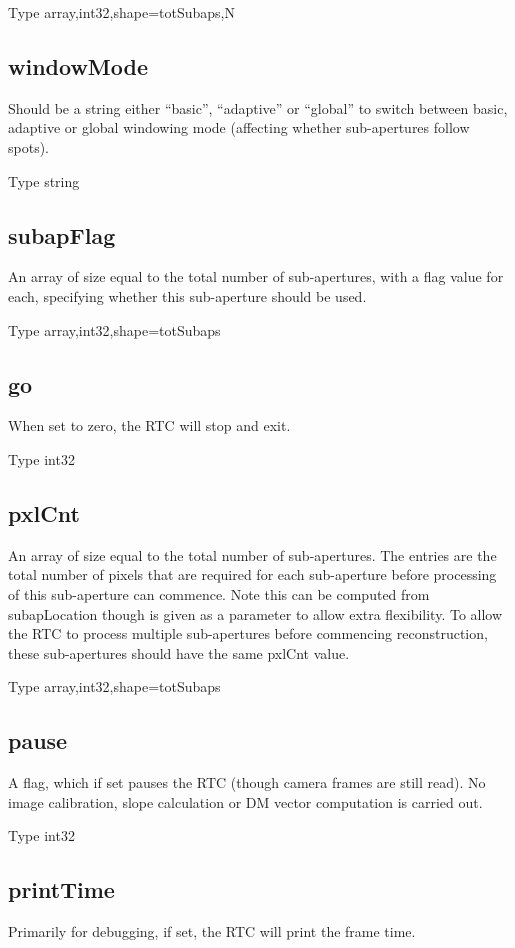 \documentclass[a4,10pt]{article}
\begin{document}
Type array,int32,shape=totSubaps,N

\subsection{windowMode}
Should be a string either ``basic'', ``adaptive'' or ``global'' to
switch between basic, adaptive or global windowing mode (affecting
whether sub-apertures follow spots).

Type string

\subsection{subapFlag}
An array of size equal to the total number of sub-apertures, with a
flag value for each, specifying whether this sub-aperture should be
used.

Type array,int32,shape=totSubaps

\subsection{go}
When set to zero, the RTC will stop and exit.

Type int32

\subsection{pxlCnt}
An array of size equal to the total number of sub-apertures.  The
entries are the total number of pixels that are required for each
sub-aperture before processing of this sub-aperture can commence.
Note this can be computed from subapLocation though is given as a
parameter to allow extra flexibility.  To allow the RTC to process
multiple sub-apertures before commencing reconstruction, these
sub-apertures should have the same pxlCnt value.

Type array,int32,shape=totSubaps

\subsection{pause}
A flag, which if set pauses the RTC (though camera frames are still
read).  No image calibration, slope calculation or DM vector
computation is carried out.

Type int32

\subsection{printTime}
Primarily for debugging, if set, the RTC will print the frame time.
\end{document}
